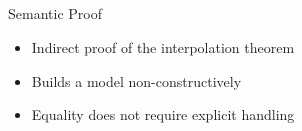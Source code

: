 \documentclass[final,compress]{beamer}
\begin{document}
\subsection{}
\begin{frame}{Semantic Proof}
	\begin{itemize}
		\item Indirect proof of the interpolation theorem 

		\item Builds a model non-constructively 

		\item Equality does not require explicit handling

	\end{itemize}




\end{frame}
\end{document}
